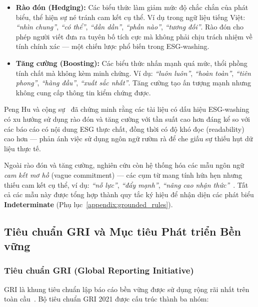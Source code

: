 \begin{itemize}
    \item \textbf{Rào đón (Hedging):} Các biểu thức làm giảm mức độ chắc chắn của phát biểu, thể hiện sự né tránh cam kết cụ thể. Ví dụ trong ngữ liệu tiếng Việt: \textit{``nhìn chung''}, \textit{``có thể''}, \textit{``dần dần''}, \textit{``phần nào''}, \textit{``tương đối''}. Rào đón cho phép người viết đưa ra tuyên bố tích cực mà không phải chịu trách nhiệm về tính chính xác --- một chiến lược phổ biến trong ESG-washing.

    \item \textbf{Tăng cường (Boosting):} Các biểu thức nhấn mạnh quá mức, thổi phồng tính chất mà không kèm minh chứng. Ví dụ: \textit{``luôn luôn''}, \textit{``hoàn toàn''}, \textit{``tiên phong''}, \textit{``hàng đầu''}, \textit{``xuất sắc nhất''}. Tăng cường tạo ấn tượng mạnh nhưng không cung cấp thông tin kiểm chứng được.
\end{itemize}

Peng Hu và cộng sự~\cite{su16062571} đã chứng minh rằng các tài liệu có dấu hiệu ESG-washing có xu hướng sử dụng rào đón và tăng cường với tần suất cao hơn đáng kể so với các báo cáo có nội dung ESG thực chất, đồng thời có độ khó đọc (readability) cao hơn --- phản ánh việc sử dụng ngôn ngữ rườm rà để che giấu sự thiếu hụt dữ liệu thực tế.

Ngoài rào đón và tăng cường, nghiên cứu còn hệ thống hóa các mẫu ngôn ngữ \textit{cam kết mơ hồ} (vague commitment) --- các cụm từ mang tính hứa hẹn nhưng thiếu cam kết cụ thể, ví dụ: \textit{``nỗ lực''}, \textit{``đẩy mạnh''}, \textit{``nâng cao nhận thức''}~\cite{florstedt2025detecting}. Tất cả các mẫu này được tổng hợp thành quy tắc ký hiệu để nhận diện các phát biểu \textbf{Indeterminate} (Phụ lục~\ref{appendix:grounded_rules}).


\subsection{Tiêu chuẩn GRI và Mục tiêu Phát triển Bền vững}
\label{subsec:gri}

\subsubsection{Tiêu chuẩn GRI (Global Reporting Initiative)}

GRI là khung tiêu chuẩn lập báo cáo bền vững được sử dụng rộng rãi nhất trên toàn cầu~\cite{gri2021gri}. Bộ tiêu chuẩn GRI 2021 được cấu trúc thành ba nhóm:


